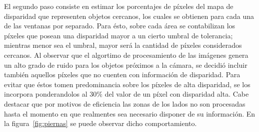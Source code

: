 \documentclass[journal]{IEEEtran}
\begin{document}
El segundo paso consiste en estimar los porcentajes de p\'ixeles del mapa de disparidad que representen objetos cercanos, los cuales se obtienen para cada una de las ventanas por separado. Para \'esto, sobre cada \'area se contabilizan los p\'ixeles que posean una disparidad mayor a un cierto umbral de tolerancia; mientras menor sea el umbral, mayor ser\'a la cantidad de p\'ixeles considerados cercanos. Al observar que el algortimo de procesamiento de las im\'agenes genera un alto grado de ruido para los objetos pr\'oximos a la c\'amara, se decidi\'o incluir tambi\'en aquellos p\'ixeles que no cuenten con informaci\'on de disparidad. Para evitar que \'estos tomen predominancia sobre los p\'ixeles de alta disparidad, se los incorpora ponderandolos al $30\%$ del valor de un p\'ixel con disparidad alta. Cabe destacar que por motivos de eficiencia las zonas de los lados no son procesadas hasta el momento en que realmentes sea necesario disponer de su informaci\'on. En la figura~\ref{fig:piernas} se puede observar dicho comportamiento.
\end{document}
